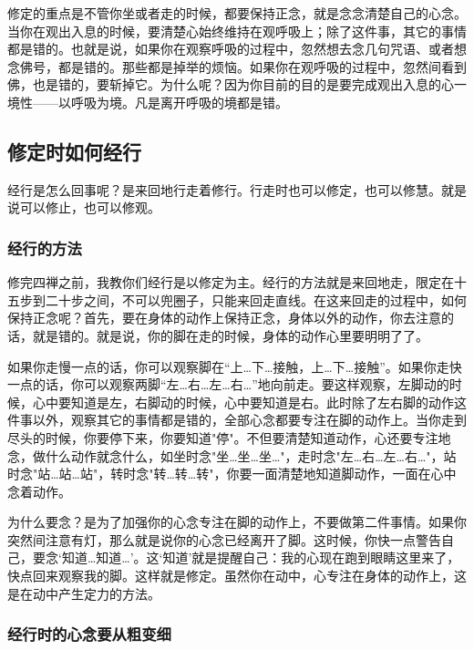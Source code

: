 \documentclass{book}
\begin{document}
修定的重点是不管你坐或者走的时候，都要保持正念，就是念念清楚自己的心念。当你在观出入息的时候，要清楚心始终维持在观呼吸上；除了这件事，其它的事情都是错的。也就是说，如果你在观察呼吸的过程中，忽然想去念几句咒语、或者想念佛号，都是错的。那些都是掉举的烦恼。如果你在观呼吸的过程中，忽然间看到佛，也是错的，要斩掉它。为什么呢？因为你目前的目的是要完成观出入息的心一境性——以呼吸为境。凡是离开呼吸的境都是错。

\subsection{修定时如何经行}

经行是怎么回事呢？是来回地行走着修行。行走时也可以修定，也可以修慧。就是说可以修止，也可以修观。

\subsubsection{经行的方法}

修完四禅之前，我教你们经行是以修定为主。经行的方法就是来回地走，限定在十五步到二十步之间，不可以兜圈子，只能来回走直线。在这来回走的过程中，如何保持正念呢？首先，要在身体的动作上保持正念，身体以外的动作，你去注意的话，就是错的。就是说，你的脚在走的时候，身体的动作心里要明明了了。

如果你走慢一点的话，你可以观察脚在``上\ldots 下\ldots 接触，上\ldots 下\ldots 接触''。如果你走快一点的话，你可以观察两脚``左\ldots 右\ldots 左\ldots 右\ldots''地向前走。要这样观察，左脚动的时候，心中要知道是左，右脚动的时候，心中要知道是右。此时除了左右脚的动作这件事以外，观察其它的事情都是错的，全部心念都要专注在脚的动作上。当你走到尽头的时候，你要停下来，你要知道"停"。不但要清楚知道动作，心还要专注地念，做什么动作就念什么，如坐时念"坐\ldots 坐\ldots 坐\ldots"，走时念"左\ldots 右\ldots 左\ldots 右\ldots"，站时念"站\ldots 站\ldots 站"，转时念"转\ldots 转\ldots 转"，你要一面清楚地知道脚动作，一面在心中念着动作。

为什么要念？是为了加强你的心念专注在脚的动作上，不要做第二件事情。如果你突然间注意有灯，那么就是说你的心念已经离开了脚。这时候，你快一点警告自己，要念`知道\ldots 知道\ldots'。这`知道'就是提醒自己：我的心现在跑到眼睛这里来了，快点回来观察我的脚。这样就是修定。虽然你在动中，心专注在身体的动作上，这是在动中产生定力的方法。

\subsubsection{经行时的心念要从粗变细}
\end{document}
